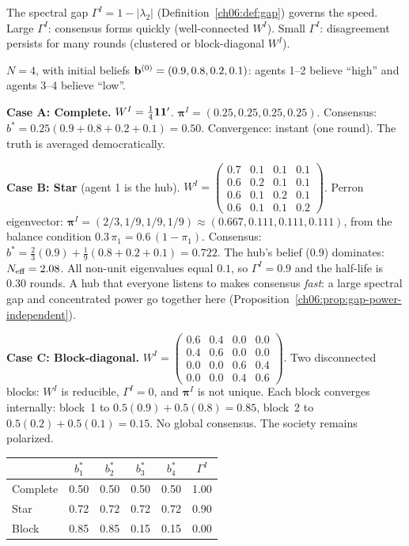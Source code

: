\documentclass[../structural_economics_book.tex]{subfiles}
\begin{document}
The spectral gap $\Gamma^I = 1 - |\lambda_2|$ (Definition~\ref{ch06:def:gap}) governs the speed. Large $\Gamma^I$: consensus forms quickly (well-connected $W^I$). Small $\Gamma^I$: disagreement persists for many rounds (clustered or block-diagonal $W^I$).

\begin{example}\label{ch08:ex:three_WI}
$N = 4$, with initial beliefs $\mathbf{b}^{(0)} = (0.9, 0.8, 0.2, 0.1)$: agents 1--2 believe ``high'' and agents 3--4 believe ``low''.

\textbf{Case A: Complete.} $W^I = \frac{1}{4}\mathbf{1}\mathbf{1}'$. $\boldsymbol{\pi}^I = (0.25, 0.25, 0.25, 0.25)$. Consensus: $b^* = 0.25(0.9 + 0.8 + 0.2 + 0.1) = 0.50$. Convergence: instant (one round). The truth is averaged democratically.

\textbf{Case B: Star} (agent 1 is the hub). $W^I = \begin{pmatrix} 0.7 & 0.1 & 0.1 & 0.1 \\ 0.6 & 0.2 & 0.1 & 0.1 \\ 0.6 & 0.1 & 0.2 & 0.1 \\ 0.6 & 0.1 & 0.1 & 0.2 \end{pmatrix}$. Perron eigenvector: $\boldsymbol{\pi}^I = (2/3, 1/9, 1/9, 1/9) \approx (0.667, 0.111, 0.111, 0.111)$, from the balance condition $0.3\,\pi_1 = 0.6\,(1 - \pi_1)$. Consensus: $b^* = \frac23(0.9) + \frac19(0.8 + 0.2 + 0.1) = 0.722$. The hub's belief (0.9) dominates: $N_{\text{eff}} = 2.08$. All non-unit eigenvalues equal $0.1$, so $\Gamma^I = 0.9$ and the half-life is $0.30$ rounds. A hub that everyone listens to makes consensus \textit{fast}: a large spectral gap and concentrated power go together here (Proposition~\ref{ch06:prop:gap-power-independent}).

\textbf{Case C: Block-diagonal.} $W^I = \begin{pmatrix} 0.6 & 0.4 & 0.0 & 0.0 \\ 0.4 & 0.6 & 0.0 & 0.0 \\ 0.0 & 0.0 & 0.6 & 0.4 \\ 0.0 & 0.0 & 0.4 & 0.6 \end{pmatrix}$. Two disconnected blocks: $W^I$ is reducible, $\Gamma^I = 0$, and $\boldsymbol{\pi}^I$ is not unique. Each block converges internally: block~1 to $0.5(0.9) + 0.5(0.8) = 0.85$, block~2 to $0.5(0.2) + 0.5(0.1) = 0.15$. No global consensus. The society remains polarized.

\begin{center}
\begin{tabular}{lccccc}
\toprule
& $b^*_1$ & $b^*_2$ & $b^*_3$ & $b^*_4$ & $\Gamma^I$ \\
\midrule
Complete & 0.50 & 0.50 & 0.50 & 0.50 & 1.00 \\
Star & 0.72 & 0.72 & 0.72 & 0.72 & 0.90 \\
Block & 0.85 & 0.85 & 0.15 & 0.15 & 0.00 \\
\bottomrule
\end{tabular}
\end{center}
\end{example}
\end{document}
